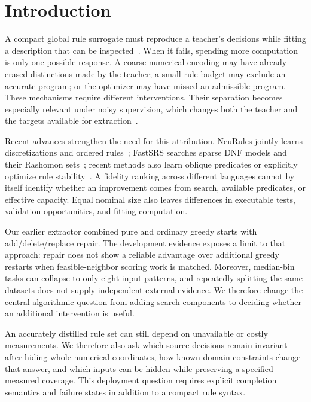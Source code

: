 \documentclass[review,12pt]{elsarticle}
\begin{document}
\section{Introduction}
A compact global rule surrogate must reproduce a teacher's decisions while fitting a description that can be inspected~\citep{craven1995,wang2017brs,lawless2023}. When it fails, spending more computation is only one possible response. A coarse numerical encoding may have already erased distinctions made by the teacher; a small rule budget may exclude an accurate program; or the optimizer may have missed an admissible program. These mechanisms require different interventions. Their separation becomes especially relevant under noisy supervision, which changes both the teacher and the targets available for extraction~\citep{frenay2014,raikovskaia2026}.

Recent advances strengthen the need for this attribution. NeuRules jointly learns discretizations and ordered rules~\citep{xu2025}; FastSRS searches sparse DNF models and their Rashomon sets~\citep{molero2026}; recent methods also learn oblique predicates or explicitly optimize rule stability~\citep{behzadimanesh2026,liu2025moss}. A fidelity ranking across different languages cannot by itself identify whether an improvement comes from search, available predicates, or effective capacity. Equal nominal size also leaves differences in executable tests, validation opportunities, and fitting computation.

Our earlier extractor combined pure and ordinary greedy starts with add/delete/replace repair. The development evidence exposes a limit to that approach: repair does not show a reliable advantage over additional greedy restarts when feasible-neighbor scoring work is matched. Moreover, median-bin tasks can collapse to only eight input patterns, and repeatedly splitting the same datasets does not supply independent external evidence. We therefore change the central algorithmic question from adding search components to deciding whether an additional intervention is useful.

An accurately distilled rule set can still depend on unavailable or costly measurements. We therefore also ask which source decisions remain invariant after hiding whole numerical coordinates, how known domain constraints change that answer, and which inputs can be hidden while preserving a specified measured coverage. This deployment question requires explicit completion semantics and failure states in addition to a compact rule syntax.
\end{document}
